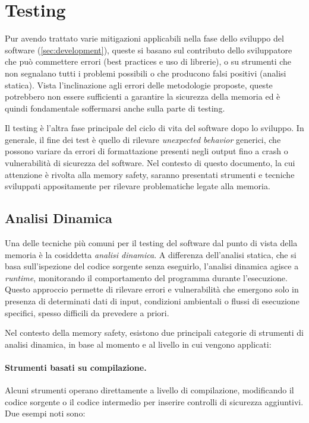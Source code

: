 \section{Testing}
\label{sec:testing}

Pur avendo trattato varie mitigazioni applicabili nella fase dello sviluppo del software
(\autoref{sec:development}), queste si basano sul contributo dello sviluppatore
che può commettere errori (best practices e uso di librerie), o su strumenti che
non segnalano tutti i problemi possibili o che producono falsi positivi (analisi
statica). Vista l'inclinazione agli errori delle metodologie proposte, queste potrebbero
non essere sufficienti a garantire la sicurezza della memoria ed è quindi fondamentale
soffermarsi anche sulla parte di testing.

Il testing è l'altra fase principale del ciclo di vita del software dopo lo sviluppo.
In generale, il fine dei test è quello di rilevare \textit{unexpected behavior}
generici, che possono variare da errori di formattazione presenti negli output fino
a crash o vulnerabilità di sicurezza del software. Nel contesto di questo
documento, la cui attenzione è rivolta alla memory safety, saranno presentati
strumenti e tecniche sviluppati appositamente per rilevare problematiche legate
alla memoria.

\subsection{Analisi Dinamica}
\label{sec:analisi-dinamica}

Una delle tecniche più comuni per il testing del software dal punto di vista della
memoria è la cosiddetta \textit{analisi dinamica}. A differenza dell'analisi statica,
che si basa sull'ispezione del codice sorgente senza eseguirlo, l'analisi dinamica
agisce a \textit{runtime}, monitorando il comportamento del programma durante l'esecuzione.
Questo approccio permette di rilevare errori e vulnerabilità che emergono solo
in presenza di determinati dati di input, condizioni ambientali o flussi di esecuzione
specifici, spesso difficili da prevedere a priori.

Nel contesto della memory safety, esistono due principali categorie di strumenti
di analisi dinamica, in base al momento e al livello in cui vengono applicati:

\paragraph{Strumenti basati su compilazione.}
Alcuni strumenti operano direttamente a livello di compilazione, modificando il
codice sorgente o il codice intermedio per inserire controlli di sicurezza
aggiuntivi. Due esempi noti sono:

